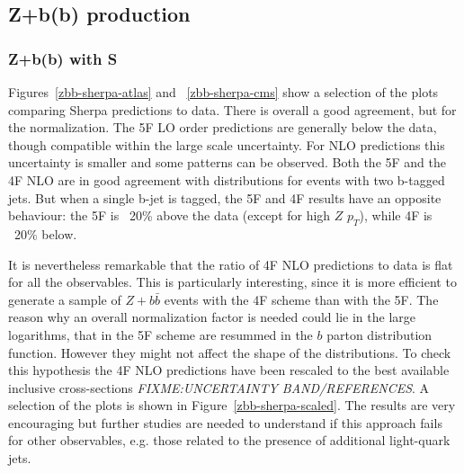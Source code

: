 \documentclass[11pt]{cernrep} \usepackage{graphicx,epsfig} 
\newcommand{\Sherpa}{S\protect\scalebox{0.8}{HERPA}\xspace}
\newcommand{\pt}{\ensuremath{p_{T}}\xspace}
\begin{document}
\subsection{Z+b(b) production \label{Zbb}}

\subsubsection{Z+b(b) with \Sherpa}

Figures~\ref{zbb-sherpa-atlas} and ~\ref{zbb-sherpa-cms} show a selection of the plots comparing Sherpa predictions to data. 
There is overall a good agreement, but for the normalization. The 5F LO order predictions are generally below the data, though compatible within
the large scale uncertainty. For NLO predictions this uncertainty is smaller and some patterns can be
observed. Both the 5F and the 4F NLO are in good agreement with distributions for events with two b-tagged jets. 
But when a single b-jet is tagged, the 5F and 4F results have an opposite 
behaviour: the 5F is ~20\% above the data (except for high $Z$ \pt), while 4F is ~20\% below. 

It is nevertheless remarkable that the ratio of 4F NLO predictions to data is flat for all the observables. This is
particularly interesting, since it is more efficient to generate a sample of $Z+b\bar{b}$ events with the 4F scheme than 
with the 5F. The reason why an overall normalization factor is needed could lie in the large logarithms, that in the 5F
scheme are resummed in the $b$ parton distribution function. However they might not affect the shape of the distributions. To check this hypothesis the 4F NLO
predictions have been rescaled to the best available inclusive cross-sections {\em FIXME:UNCERTAINTY BAND/REFERENCES}. A selection of the plots is
shown in Figure~\ref{zbb-sherpa-scaled}. The results are very encouraging but further studies are needed to understand
if this approach fails for other observables, e.g. those related to the presence of additional light-quark jets.  
\end{document}
